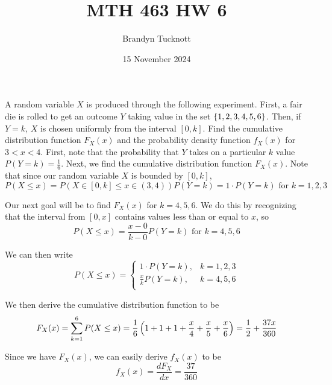 \documentclass{exam}
\title{MTH 463 HW 6}
\author{Brandyn Tucknott}
\date{15 November 2024}
\begin{document}
\maketitle

\begin{questions}
    \question
A random variable $X$ is produced through the following experiment. First, a fair die is rolled to get an outcome $Y$ taking value in the set $\left \{ 1, 2, 3, 4, 5, 6 \right \}$. Then, if $Y = k$, $X$ is chosen uniformly from the interval $[0, k]$. Find the cumulative distribution function $F_X(x)$ and the probability density function $f_X(x)$ for $3 < x < 4$.
\sol
First, note that the probability that $Y$ takes on a particular $k$ value $P(Y = k) = \frac{1}{6}$. Next, we find the cumulative distribution function $F_X(x)$. Note that since our random variable $X$ is bounded by $[0, k]$, 
$$P(X \leq x) = P(X \in [0, k] \leq x \in (3, 4))P(Y = k) =  1 \cdot P(Y = k) \text{ for }k = 1, 2, 3$$

Our next goal will be to find $F_X(x)$ for $k = 4, 5, 6$. We do this by recognizing that the interval from $[0, x]$ contains values less than or equal to $x$, so 
$$P(X \leq x) = \frac{x - 0}{k - 0}P(Y = k) \text{ for } k = 4, 5, 6$$

We can then write
$$P(X \leq x) =
\begin{cases}
    1 \cdot P(Y = k), & k = 1, 2, 3 \\
    \frac{x}{k}P(Y = k), & k = 4, 5, 6 \\
\end{cases}$$

We then derive the cumulative distribution function to be
$$F_X(x) = \sum_{k = 1}^6 P(X \leq x) = \frac{1}{6}\left( 1 + 1 + 1 + \frac{x}{4} + \frac{x}{5} + \frac{x}{6} \right) = \frac{1}{2} + \frac{37x}{360}$$

Since we have $F_X(x)$, we can easily derive $f_X(x)$ to be
$$f_X(x) = \frac{dF_X}{dx} = \frac{37}{360}$$


\newpage
\question
{}
\end{questions}
\end{document}
